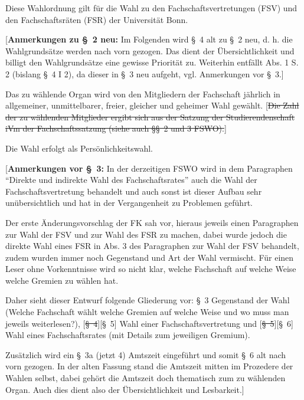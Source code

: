 \documentclass[%
draft,%
multilinesections%
]{fswo}
\newcommand\oldT[1]  {{\color{Gray}[\st{#1}]}}
\newcommand\newT[1]  {{\color{Green}[#1]}}
\newcommand\bemFr[1] {{\color{Red}[#1]}}
\newcommand\oldT[1]{}%
\newcommand\newT[1]{#1}
\newcommand\bemFr[1]{}%
\newcommand\change[2]{\oldT{#1}\newT{#2}}
\begin{document}
\begin{contract}
Diese Wahlordnung gilt für die Wahl zu den Fachschaftsvertretungen (FSV) und den Fachschaftsräten (FSR) der Universität Bonn.
\end{contract}

\bemFr{\textbf{Anmerkungen zu \S~2 neu:}
Im Folgenden wird \S~4 alt zu \S~2 neu, d. h. die Wahlgrundsätze werden nach vorn gezogen.
Das dient der Übersichtlichkeit und billigt den Wahlgrundsätze eine gewisse Priorität zu.
Weiterhin entfällt Abs. 1 S. 2 (bislang \S~4 I 2), da dieser in \S~3 neu aufgeht, vgl. Anmerkungen vor \S~3.}

\begin{contract}
Das zu wählende Organ wird von den Mitgliedern der Fachschaft jährlich in allgemeiner, unmittelbarer, freier, gleicher und geheimer Wahl gewählt. \oldT{Die Zahl der zu wählenden Mitglieder ergibt sich aus der Satzung der Studierendenschaft iVm der Fachschaftssatzung (siehe auch \S\S~2 und 3 FSWO).}

Die Wahl erfolgt als Persönlichkeitswahl.
\end{contract}

\bemFr{\textbf{Anmerkungen vor \S~3:} In der derzeitigen FSWO wird in dem Paragraphen \enquote{Direkte und indirekte Wahl des Fachschaftsrates} auch die Wahl der Fachschaftsvertretung behandelt und auch sonst ist dieser Aufbau sehr unübersichtlich und hat in der Vergangenheit zu Problemen geführt.

Der erste Änderungsvorschlag der FK sah vor, hieraus jeweils einen Paragraphen zur Wahl der FSV und zur Wahl des FSR zu machen, dabei wurde jedoch die direkte Wahl eines FSR in Abs. 3 des Paragraphen zur Wahl der FSV behandelt, zudem wurden immer noch Gegenstand und Art der Wahl vermischt.
Für einen Leser ohne Vorkenntnisse wird so nicht klar, welche Fachschaft auf welche Weise welche Gremien zu wählen hat.

Daher sieht dieser Entwurf folgende Gliederung vor:
\S~3 Gegenstand der Wahl (Welche Fachschaft wählt welche Gremien auf welche Weise und wo muss man jeweils weiterlesen?), \change{\S~4}{\S~5} Wahl einer Fachschaftsvertretung und \change{\S~5}{\S~6} Wahl eines Fachschaftsrates (mit Details zum jeweiligen Gremium).

Zusätzlich wird ein \S~3a (jetzt 4) Amtszeit eingeführt und somit \S~6 alt nach vorn gezogen. In der alten Fassung stand die Amtszeit mitten im Prozedere der Wahlen selbst, dabei gehört die Amtszeit doch thematisch zum zu wählenden Organ. Auch dies dient also der Übersichtlichkeit und Lesbarkeit.}
\end{document}
